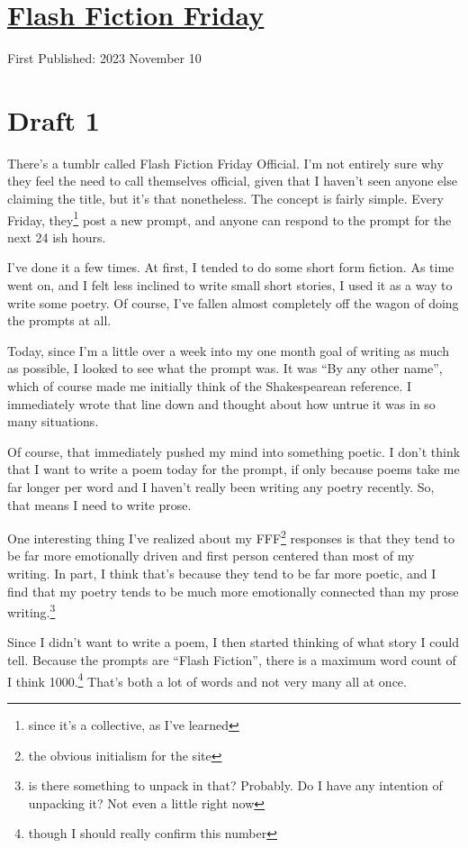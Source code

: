 \documentclass[12pt]{article}[titlepage]
\newcommand{\say}[1]{``#1''}
\newcommand{\1}{\={a}}
\newcommand{\2}{\={e}}
\newcommand{\3}{\={\i}}
\newcommand{\4}{\=o}
\newcommand{\5}{\=u}
\newcommand{\6}{\={A}}
\renewcommand{\,}{\textsuperscript{,}}
\begin{document}
\doublespacing
\section{\href{flash-fiction.html}{Flash Fiction Friday}}
First Published: 2023 November 10

\section{Draft 1}
There's a tumblr called Flash Fiction Friday Official.
I'm not entirely sure why they feel the need to call themselves official, given that I haven't seen anyone else claiming the title, but it's that nonetheless.
The concept is fairly simple.
Every Friday, they\footnote{since it's a collective, as I've learned} post a new prompt, and anyone can respond to the prompt for the next 24 ish hours.

I've done it a few times.
At first, I tended to do some short form fiction.
As time went on, and I felt less inclined to write small short stories, I used it as a way to write some poetry.
Of course, I've fallen almost completely off the wagon of doing the prompts at all.

Today, since I'm a little over a week into my one month goal of writing as much as possible, I looked to see what the prompt was.
It was \say{By any other name}, which of course made me initially think of the Shakespearean reference.
I immediately wrote that line down and thought about how untrue it was in so many situations.

Of course, that immediately pushed my mind into something poetic.
I don't think that I want to write a poem today for the prompt, if only because poems take me far longer per word and I haven't really been writing any poetry recently.
So, that means I need to write prose.

One interesting thing I've realized about my FFF\footnote{the obvious initialism for the site} responses is that they tend to be far more emotionally driven and first person centered than most of my writing.
In part, I think that's because they tend to be far more poetic, and I find that my poetry tends to be much more emotionally connected than my prose writing.\footnote{is there something to unpack in that?
Probably.
Do I have any intention of unpacking it?
Not even a little right now}

Since I didn't want to write a poem, I then started thinking of what story I could tell.
Because the prompts are \say{Flash Fiction}, there is a maximum word count of I think 1000.\footnote{though I should really confirm this number}
That's both a lot of words and not very many all at once.
\end{document}
